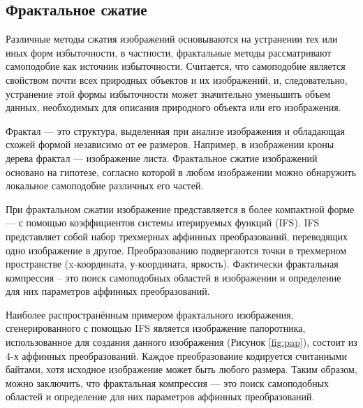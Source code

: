     
    \subsection{Фрактальное сжатие}
    
    Различные методы сжатия изображений основываются на устранении тех или иных форм избыточности, в частности, фрактальные методы рассматривают самоподобие как источник избыточности. Считается, что самоподобие является свойством почти всех природных объектов и их изображений, и, следовательно, устранение этой формы избыточности может значительно уменьшить объем данных, необходимых для описания природного объекта или его изображения.\cite{frac}
    
    Фрактал --- это структура, выделенная при анализе изображения и обладающая схожей формой независимо от ее размеров. Например, в изображении кроны дерева фрактал --- изображение листа. Фрактальное сжатие изображений основано на гипотезе, согласно которой в любом изображении можно обнаружить локальное самоподобие
    различных его частей.\cite{91}
    
    При фрактальном сжатии изображение представляется в более компактной форме --- с помощью коэффициентов системы итерируемых функций (IFS). IFS представляет
    собой набор трехмерных аффинных преобразований, переводящих одно изображение в
    другое. Преобразованию подвергаются точки в трехмерном пространстве (x-координата, у-координата, яркость). Фактически фрактальная компрессия – это поиск
    самоподобных областей в изображении и определение для них параметров аффинных
    преобразований. \cite{fr}
    

	Наиболее распространённым примером фрактального изображения,
сгенерированного с помощью IFS является изображение папоротника, использованное для создания данного изображения (Рисунок \ref{fig:pap}),  состоит из 4-х
аффинных преобразований. Каждое преобразование кодируется считанными
байтами, хотя исходное изображение может быть любого размера. Таким
образом, можно заключить, что фрактальная компрессия --– это поиск
самоподобных областей и определение для них параметров аффинных
преобразований.    
    
